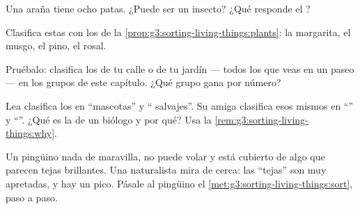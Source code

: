 \begin{exercise}[$\star$]\label{exo:g3:sorting-living-things:6}
Una araña tiene ocho patas. ¿Puede ser un insecto? ¿Qué responde el
?
\end{exercise}

\begin{exercise}[$\star$]\label{exo:g3:sorting-living-things:7}
Clasifica estas  con los  de la
\cref{prop:g3:sorting-living-things:plants}: la margarita, el musgo,
el pino, el rosal.
\end{exercise}

\begin{exercise}[$\star$]\label{exo:g3:sorting-living-things:8}
Pruébalo: clasifica los  de tu calle o de tu jardín --- todos
los que veas en un paseo --- en los grupos de este capítulo. ¿Qué
grupo gana por número?
\end{exercise}

\begin{exercise}[$\star\star$]\label{exo:g3:sorting-living-things:9}
Lea clasifica los  en ``mascotas'' y `` salvajes''.
Su amiga clasifica esos mismos  en ``'' y ``''.
¿Qué  es la de un biólogo y por qué? Usa la
\cref{rem:g3:sorting-living-things:why}.
\end{exercise}

\begin{exercise}[$\star\star$]\label{exo:g3:sorting-living-things:10}
Un pingüino nada de maravilla, no puede volar y está cubierto de algo
que parecen tejas brillantes. Una naturalista mira de cerca: las
``tejas'' son  muy apretadas, y hay un pico. Pásale al pingüino
el \cref{met:g3:sorting-living-things:sort}, paso a paso.
\end{exercise}

